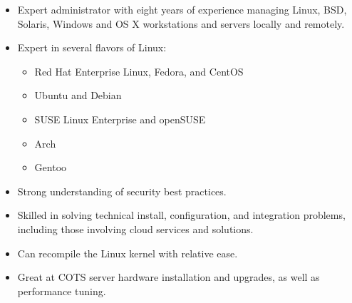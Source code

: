 \documentclass[a4paper,12pt]{memoir} %
\begin{document}
\userinformation %

\framebreak %






\begin{itemize}
	\item Expert administrator with eight years of experience managing Linux, BSD,
		Solaris, Windows and OS X workstations and servers locally and remotely.
	\item Expert in several flavors of Linux:
		\begin{itemize}
			\item Red Hat Enterprise Linux, Fedora, and CentOS
			\item Ubuntu and Debian
			\item SUSE Linux Enterprise and openSUSE
			\item Arch
			\item Gentoo
		\end{itemize}
	\item Strong understanding of security best practices.
	\item Skilled in solving technical install, configuration, and integration problems, including
		those involving cloud services and solutions.
	\item Can recompile the Linux kernel with relative ease.
	\item Great at COTS server hardware installation and upgrades, as well as performance tuning.
\end{itemize}
\Sep
\end{document}
